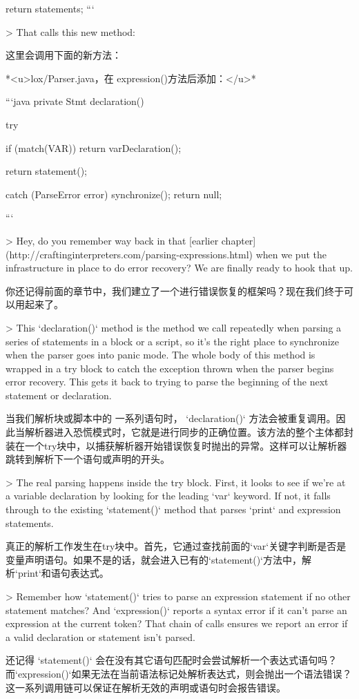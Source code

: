 \documentclass[cn,11pt,chinese]{elegantbook}
\begin{document}
{{{{    return statements; 
  }
```

> That calls this new method:

这里会调用下面的新方法：

*<u>lox/Parser.java，在 expression()方法后添加：</u>*

```java
  private Stmt declaration() {
    try {
      if (match(VAR)) return varDeclaration();

      return statement();
    } catch (ParseError error) {
      synchronize();
      return null;
    }
  }
```

> Hey, do you remember way back in that [earlier chapter](http://craftinginterpreters.com/parsing-expressions.html) when we put the infrastructure in place to do error recovery? We are finally ready to hook that up.

你还记得前面的章节中，我们建立了一个进行错误恢复的框架吗？现在我们终于可以用起来了。

> This `declaration()` method is the method we call repeatedly when parsing a series of statements in a block or a script, so it’s the right place to synchronize when the parser goes into panic mode. The whole body of this method is wrapped in a try block to catch the exception thrown when the parser begins error recovery. This gets it back to trying to parse the beginning of the next statement or declaration.

当我们解析块或脚本中的 一系列语句时， `declaration()` 方法会被重复调用。因此当解析器进入恐慌模式时，它就是进行同步的正确位置。该方法的整个主体都封装在一个try块中，以捕获解析器开始错误恢复时抛出的异常。这样可以让解析器跳转到解析下一个语句或声明的开头。

> The real parsing happens inside the try block. First, it looks to see if we’re at a variable declaration by looking for the leading `var` keyword. If not, it falls through to the existing `statement()` method that parses `print` and expression statements.

真正的解析工作发生在try块中。首先，它通过查找前面的`var`关键字判断是否是变量声明语句。如果不是的话，就会进入已有的`statement()`方法中，解析`print`和语句表达式。

> Remember how `statement()` tries to parse an expression statement if no other statement matches? And `expression()` reports a syntax error if it can’t parse an expression at the current token? That chain of calls ensures we report an error if a valid declaration or statement isn’t parsed.

还记得 `statement()` 会在没有其它语句匹配时会尝试解析一个表达式语句吗？而`expression()`如果无法在当前语法标记处解析表达式，则会抛出一个语法错误？这一系列调用链可以保证在解析无效的声明或语句时会报告错误。

}}}
\end{document}
